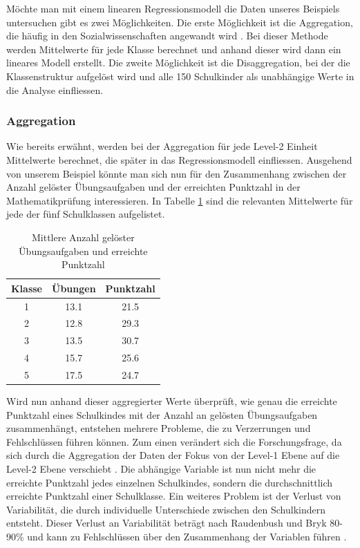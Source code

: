 \documentclass[12pt]{article}\usepackage[]{graphicx}\usepackage[]{color}
\begin{document}
Möchte man mit einem linearen Regressionsmodell die Daten unseres Beispiels untersuchen gibt es zwei Möglichkeiten. Die erste Möglichkeit ist die Aggregation, die häufig in den Sozialwissenschaften angewandt wird \citep{SnijdersTomA.B2012Ma:a}. Bei dieser Methode werden Mittelwerte für jede Klasse berechnet und anhand dieser wird dann ein lineares Modell erstellt. Die zweite Möglichkeit ist die Disaggregation, bei der die Klassenstruktur aufgelöst wird und alle 150 Schulkinder als unabhängige Werte in die Analyse einfliessen.

\subsubsection{Aggregation}
Wie bereits erwähnt, werden bei der Aggregation für jede Level-2 Einheit Mittelwerte berechnet, die später in das Regressionsmodell einfliessen. Ausgehend von unserem Beispiel könnte man sich nun für den Zusammenhang zwischen der Anzahl gelöster Übungsaufgaben und der erreichten Punktzahl in der Mathematikprüfung interessieren. In Tabelle \ref{tab:aggregation} sind die relevanten Mittelwerte für jede der fünf Schulklassen aufgelistet.

\begin{table}[b]
\centering
\begin{threeparttable}
\caption{Mittlere Anzahl gelöster Übungsaufgaben und erreichte Punktzahl}
\begin{tabular}{ccc}
  \toprule
Klasse & Übungen & Punktzahl \\ 
  \midrule
1 & 13.1 & 21.5 \\ 
2 & 12.8 & 29.3 \\ 
3 & 13.5 & 30.7 \\ 
4 & 15.7 & 25.6 \\ 
5 & 17.5 & 24.7 \\ 
   \bottomrule
\end{tabular}
\label{tab:aggregation}
\end{threeparttable}
\end{table}

Wird nun anhand dieser aggregierter Werte überprüft, wie genau die erreichte Punktzahl eines Schulkindes mit der Anzahl an gelösten Übungsaufgaben zusammenhängt, entstehen mehrere Probleme, die zu Verzerrungen und Fehlschlüssen führen können. Zum einen verändert sich die Forschungsfrage, da sich durch die Aggregation der Daten der Fokus von der Level-1 Ebene auf die Level-2 Ebene verschiebt \citep{SnijdersTomA.B2012Ma:a, woltman2012introduction}. Die abhängige Variable ist nun nicht mehr die erreichte Punktzahl jedes einzelnen Schulkindes, sondern die durchschnittlich erreichte Punktzahl einer Schulklasse. Ein weiteres Problem ist der Verlust von Variabilität, die durch individuelle Unterschiede zwischen den Schulkindern entsteht. Dieser Verlust an Variabilität beträgt nach Raudenbush und Bryk 80-90\% und kann zu Fehlschlüssen über den Zusammenhang der Variablen führen \citep{raudenbush2002hierarchical}. 
\end{document}

